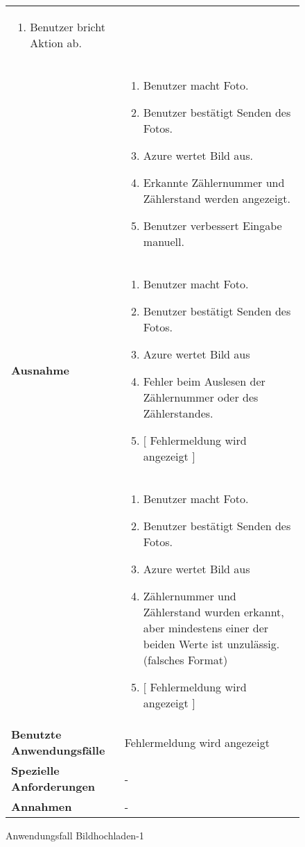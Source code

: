\begin{figure}[h]
\begin{tabularx}{\textwidth}{ X | X }
\begin{enumerate}
			\item Benutzer bricht Aktion ab.
		\end{enumerate} \\ &
		\begin{enumerate}
			\item Benutzer macht Foto.
			\item Benutzer bestätigt Senden des Fotos.
			\item Azure wertet Bild aus.
			\item Erkannte Zählernummer und Zählerstand werden angezeigt.
			\item Benutzer verbessert Eingabe manuell.
\newpage
		\end{enumerate} \\ \hline
		\textbf{Ausnahme} &
		\begin{enumerate}
			\item Benutzer macht Foto.
			\item Benutzer bestätigt Senden des Fotos.
			\item Azure wertet Bild aus
			\item Fehler beim Auslesen der Zählernummer oder des Zählerstandes.
			\item $\lbrack$ Fehlermeldung wird angezeigt $\rbrack$
		\end{enumerate} \\ &
		\begin{enumerate}
			\item Benutzer macht Foto.
			\item Benutzer bestätigt Senden des Fotos.
			\item Azure wertet Bild aus
			\item Zählernummer und Zählerstand wurden erkannt, aber mindestens einer der beiden Werte ist unzulässig. (falsches Format)
			\item $\lbrack$ Fehlermeldung wird angezeigt $\rbrack$
		\end{enumerate}  \\ \hline
		\textbf{Benutzte Anwendungsfälle} & Fehlermeldung wird angezeigt \\ \hline
		\textbf{Spezielle Anforderungen} & - \\ \hline
		\textbf{Annahmen} & -
	\end{tabularx}
	\caption{Anwendungsfall Bildhochladen-1}
	\label{fig:anwendungsfall-server-tabelle-xx-1}
\end{figure}

\newpage


